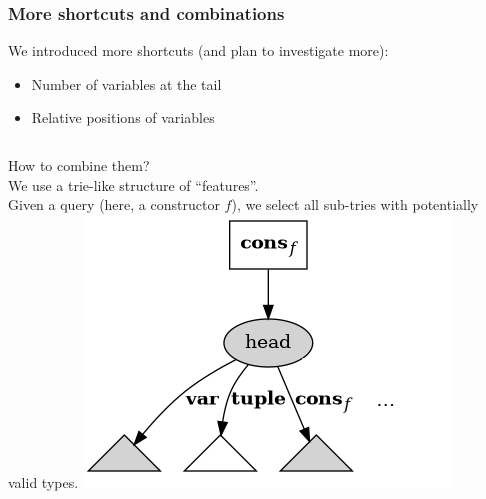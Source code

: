 \documentclass[aspectratio=169,dvipsnames,svgnames,10pt]{beamer}
\begin{document}
\begin{frame}
  \frametitle{More shortcuts and combinations}

  We introduced more shortcuts (and plan to investigate more):
  \begin{itemize}
  \item Number of variables at the tail
  \item Relative positions of variables
  \end{itemize}

  \vfill

  \begin{columns}
    {\Large How to combine them?}\\
    We use a trie-like structure of ``features''.\\
    Given a query (here, a constructor $f$), we select all sub-tries
    with potentially valid types.
    \includegraphics[width=\textwidth]{crit1_3}
  \end{columns}

\end{frame}
\end{document}
